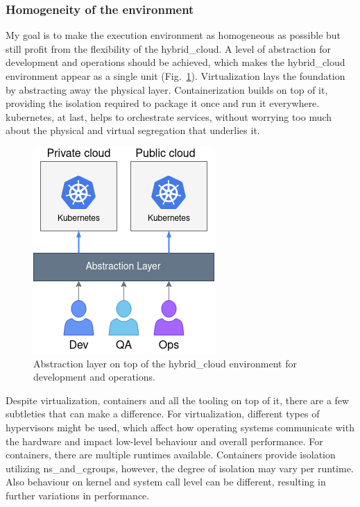 \documentclass[../main.tex]{subfiles}
\begin{document}
    \subsubsection{Homogeneity of the environment}

    My goal is to make the execution environment as homogeneous as possible but still profit from the flexibility of the \gls{hybrid_cloud}.
    A level of abstraction for development and operations should be achieved, which makes the \gls{hybrid_cloud} environment appear as a single unit (Fig.~\ref{fig:cloud_abstraction}).
    Virtualization lays the foundation by abstracting away the physical layer.
    Containerization builds on top of it, providing the isolation required to package it once and run it everywhere.
    \gls{kubernetes}, at last, helps to orchestrate services, without worrying too much about the physical and virtual segregation that underlies it.

    \begin{figure}[h]
        \centering
        \includegraphics[width=.6\linewidth]{img/concepts_cloud_abstraction_v2.png}
        \captionsetup{justification=centering}
        \caption{
            Abstraction layer on top of the \gls{hybrid_cloud} environment for development and operations.
        }
        \label{fig:cloud_abstraction}
    \end{figure}

    Despite virtualization, containers and all the tooling on top of it, there are a few subtleties that can make a difference.
    For virtualization, different types of hypervisors might be used, which affect how operating systems communicate with the hardware and impact low-level behaviour and overall performance.
    For containers, there are multiple runtimes available.
    Containers provide isolation utilizing \gls{ns_and_cgroups}, however, the degree of isolation may vary per runtime.
    Also behaviour on kernel and system call level can be different, resulting in further variations in performance.\cite{k8s_subtl_virt,k8s_subtl_conts}
\end{document}
